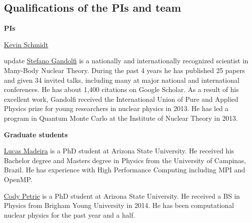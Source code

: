 \documentclass[12pt,letterpaper]{article}
\begin{document}
\subsection{Qualifications of the PIs and team}

\textbf{PIs}

\underline{Kevin Schmidt}

{\color{red} update} \underline{Stefano Gandolfi} is a nationally and 
internationally recognized scientist in Many-Body Nuclear Theory. During the 
past 4 years he has published 25 papers and given 34 invited talks, 
including many at major national and international conferences. He has about 
1,400 citations on Google Scholar. As a result of his excellent work, 
Gandolfi received the International Union of Pure and Applied Physics prize 
for young researchers in nuclear physics in 2013. He has led a program in 
Quantum Monte Carlo at the Institute of Nuclear Theory in 2013.

\textbf{Graduate students}

\underline{Lucas Madeira} is a PhD student at Arizona State University. He 
received his Bachelor degree and Masters degree in Physics from the 
University of Campinas, Brazil. He has experience with High Performance 
Computing including MPI and OpenMP.

\underline{Cody Petrie} is a PhD student at Arizona State University. He received a BS in Physics from Brigham Young University in 2014. He has been computational nuclear physics for the past year and a half.

\newpage


\end{document}
